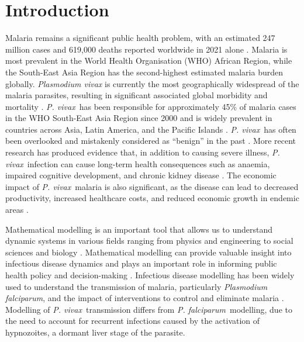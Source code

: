 \documentclass[12pt]{article}
\newcommand{\pv}{\textit{P. vivax}}
\newcommand{\pf}{\textit{P. falciparum}}
\begin{document}
\section{Introduction}\label{Intro}
Malaria remains a  significant public health problem, with an estimated 247 million cases and 619,000 deaths reported worldwide in 2021 alone \cite{world2022world}. Malaria is most prevalent in the World Health Organisation (WHO) African Region, while the South-East Asia Region has the second-highest estimated malaria burden globally. \textit{Plasmodium vivax} is currently the most geographically widespread of the malaria parasites, resulting in significant associated global morbidity and mortality \cite{antinori2012biology,battle2019mapping,anwar2023optimal,price2020plasmodium}. \pv~has been responsible for approximately 45\% of malaria cases in the WHO South-East Asia Region since 2000 and is widely prevalent in countries across Asia, Latin America, and the Pacific Islands \cite{battle2019mapping,world2022world,price2020plasmodium}. \pv~has often been overlooked and mistakenly considered as ``benign'' in the past \cite{price2007vivax,price2020plasmodium}. More recent research has produced evidence that, in addition to causing severe illness, \pv~infection can cause long-term health consequences such as anaemia, impaired cognitive development, and chronic kidney disease \cite{breman2007defining,tjitra2008multidrug,kochar2009severe,baird2013evidence}. The economic impact of \pv~malaria is also significant, as the disease can lead to decreased productivity, increased healthcare costs, and reduced economic growth in endemic areas \cite{devine2021global}.  

Mathematical modelling is an important tool that allows us to understand dynamic systems in various fields ranging from physics and engineering to social sciences and biology \cite{keeling2011modeling}. Mathematical modelling can provide valuable insight into infectious disease dynamics and plays an important role in informing public health policy and decision-making \cite{barnabas2006epidemiology,huppert2013mathematical}. Infectious disease modelling has been widely used to understand the transmission of malaria, particularly \textit{Plasmodium falciparum}, and the impact of interventions to control and eliminate malaria \cite{mandal2011mathematical,smith2018agent}. Modelling of \pv~transmission differs from \pf~modelling, due to the need to account for recurrent infections caused by the activation of hypnozoites, a dormant liver stage of the parasite.
\end{document}
